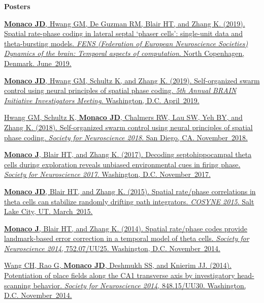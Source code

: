 \documentclass[10pt]{article}
\begin{document}
\begin{description}
\item \textbf{Posters}

\item[\quad] \href{https://www.fens.org/Meetings/The-Brain-Conferences/Dynamics-of-the-brain/}{\textbf{Monaco JD}, Hwang GM, De Guzman RM, Blair HT, and Zhang K. (2019). Spatial rate-phase coding in lateral septal ‘phaser cells’: single-unit data and theta-bursting models. \emph{FENS (Federation of European Neuroscience Societies) Dynamics of the brain: Temporal aspects of computation}. North Copenhagen, Denmark. June~2019.}
\item[\quad] \href{http://www.cvent.com/events/5th-annual-brain-initiative-investigators-meeting/event-summary-de9c0d8f934b46eb8d80b55bcfbfe96a.aspx}{\textbf{Monaco JD}, Hwang GM, Schultz K, and Zhang K. (2019). Self-organized swarm control using neural principles of spatial phase coding. \emph{5th Annual BRAIN Initiative Investigators Meeting}. Washington, D.C. April~2019.}
\item[\quad] \href{https://abstractsonline.com/pp8/#!/4649/presentation/10884}{Hwang GM, Schultz K, \textbf{Monaco JD}, Chalmers RW, Lau SW, Yeh BY, and Zhang K. (2018). Self-organized swarm control using neural principles of spatial phase coding. \emph{Society for Neuroscience 2018}. San Diego, CA. November~2018.}
\item[\quad] \href{http://www.abstractsonline.com/pp8/#!/4376/presentation/6085}{\textbf{Monaco J}, Blair HT, and Zhang K. (2017). Decoding septohippocampal theta cells during exploration reveals unbiased environmental cues in firing phase. \emph{Society for Neuroscience 2017}. Washington, D.C. November~2017.}
\item[\quad] \href{http://jdmonaco.com/files/monaco-paper-cosyne15.pdf}{\textbf{Monaco JD}, Blair HT, and Zhang K. (2015). Spatial rate/phase correlations in theta cells can stabilize randomly drifting path integrators. \emph{COSYNE 2015}. Salt Lake City, UT. March~2015.}
\item[\quad] \href{http://www.abstractsonline.com/Plan/ViewAbstract.aspx?sKey=973d2662-ba7a-4ad2-aff9-fe0d4b77c262&cKey=9917ffaf-9e31-4213-acb9-4aab498ab4cd&mKey=54c85d94-6d69-4b09-afaa-502c0e680ca7}{\textbf{Monaco J}, Blair HT, and Zhang K. (2014). Spatial rate/phase codes provide landmark-based error correction in a temporal model of theta cells. \emph{Society for Neuroscience 2014}, 752.07/UU25. Washington, D.C. November~2014.}
\item[\quad] \href{http://www.abstractsonline.com/Plan/ViewAbstract.aspx?sKey=bfb59866-8deb-44a6-9515-a7aab630507b&cKey=d201b3aa-7725-452e-b0dd-c41d204b5b54&mKey=54c85d94-6d69-4b09-afaa-502c0e680ca7}{Wang CH, Rao G, \textbf{Monaco JD}, Deshmukh SS, and Knierim JJ. (2014). Potentiation of place fields along the CA1 transverse axis by investigatory head-scanning behavior. \emph{Society for Neuroscience 2014}, 848.15/UU30. Washington, D.C. November~2014.}

\end{description}
\end{document}
